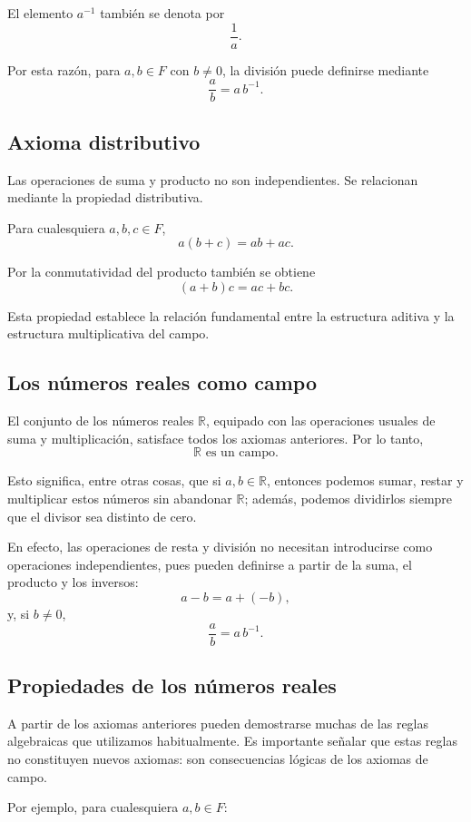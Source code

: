 \documentclass[12pt]{article}
\theoremstyle{plain}
\theoremstyle{definition}
\theoremstyle{remark}
\begin{document}
El elemento $a^{-1}$ también se denota por
\[
\frac{1}{a}.
\]

Por esta razón, para $a,b\in F$ con $b\neq0$, la división puede definirse
mediante
\[
\frac{a}{b}=a\,b^{-1}.
\]

\subsection*{Axioma distributivo}

Las operaciones de suma y producto no son independientes. Se relacionan
mediante la propiedad distributiva.

Para cualesquiera $a,b,c\in F$,
\[
a(b+c)=ab+ac.
\]

Por la conmutatividad del producto también se obtiene
\[
(a+b)c=ac+bc.
\]

Esta propiedad establece la relación fundamental entre la estructura aditiva
y la estructura multiplicativa del campo.

\subsection*{Los números reales como campo}

El conjunto de los números reales $\mathbb{R}$, equipado con las operaciones
usuales de suma y multiplicación, satisface todos los axiomas anteriores.
Por lo tanto,
\[
\boxed{\mathbb{R}\text{ es un campo}.}
\]

Esto significa, entre otras cosas, que si $a,b\in\mathbb{R}$, entonces
podemos sumar, restar y multiplicar estos números sin abandonar
$\mathbb{R}$; además, podemos dividirlos siempre que el divisor sea distinto
de cero.

En efecto, las operaciones de resta y división no necesitan introducirse
como operaciones independientes, pues pueden definirse a partir de la suma,
el producto y los inversos:
\[
a-b=a+(-b),
\]
y, si $b\neq0$,
\[
\frac{a}{b}=a\,b^{-1}.
\]

\subsection*{Propiedades de los n\'umeros reales}

A partir de los axiomas anteriores pueden demostrarse muchas de las reglas
algebraicas que utilizamos habitualmente. Es importante señalar que estas
reglas no constituyen nuevos axiomas: son consecuencias lógicas de los
axiomas de campo.

Por ejemplo, para cualesquiera $a,b\in F$:
\end{document}

